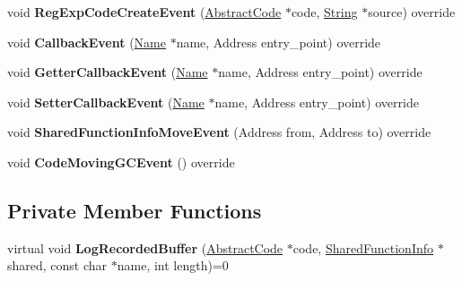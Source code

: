 \begin{DoxyCompactItemize}
\item 
void {\bfseries Reg\+Exp\+Code\+Create\+Event} (\hyperlink{classv8_1_1internal_1_1_abstract_code}{Abstract\+Code} $\ast$code, \hyperlink{classv8_1_1internal_1_1_string}{String} $\ast$source) override\hypertarget{classv8_1_1internal_1_1_code_event_logger_a8bb646de3165bbe1a39a0c07b3075f55}{}\label{classv8_1_1internal_1_1_code_event_logger_a8bb646de3165bbe1a39a0c07b3075f55}

\item 
void {\bfseries Callback\+Event} (\hyperlink{classv8_1_1internal_1_1_name}{Name} $\ast$name, Address entry\+\_\+point) override\hypertarget{classv8_1_1internal_1_1_code_event_logger_a81b0e268b2e5318d574cbf0862b101bc}{}\label{classv8_1_1internal_1_1_code_event_logger_a81b0e268b2e5318d574cbf0862b101bc}

\item 
void {\bfseries Getter\+Callback\+Event} (\hyperlink{classv8_1_1internal_1_1_name}{Name} $\ast$name, Address entry\+\_\+point) override\hypertarget{classv8_1_1internal_1_1_code_event_logger_a3caaade2e5e702420a1ac63f1a009170}{}\label{classv8_1_1internal_1_1_code_event_logger_a3caaade2e5e702420a1ac63f1a009170}

\item 
void {\bfseries Setter\+Callback\+Event} (\hyperlink{classv8_1_1internal_1_1_name}{Name} $\ast$name, Address entry\+\_\+point) override\hypertarget{classv8_1_1internal_1_1_code_event_logger_aaa5517c3a288585208e959bf92c0f5ad}{}\label{classv8_1_1internal_1_1_code_event_logger_aaa5517c3a288585208e959bf92c0f5ad}

\item 
void {\bfseries Shared\+Function\+Info\+Move\+Event} (Address from, Address to) override\hypertarget{classv8_1_1internal_1_1_code_event_logger_aba57706aa2d5625494d9cf6182a0bf07}{}\label{classv8_1_1internal_1_1_code_event_logger_aba57706aa2d5625494d9cf6182a0bf07}

\item 
void {\bfseries Code\+Moving\+G\+C\+Event} () override\hypertarget{classv8_1_1internal_1_1_code_event_logger_a1e7773a2cbfc92976ed978cd58aacce3}{}\label{classv8_1_1internal_1_1_code_event_logger_a1e7773a2cbfc92976ed978cd58aacce3}

\end{DoxyCompactItemize}
\subsection*{Private Member Functions}
\begin{DoxyCompactItemize}
\item 
virtual void {\bfseries Log\+Recorded\+Buffer} (\hyperlink{classv8_1_1internal_1_1_abstract_code}{Abstract\+Code} $\ast$code, \hyperlink{classv8_1_1internal_1_1_shared_function_info}{Shared\+Function\+Info} $\ast$shared, const char $\ast$name, int length)=0\hypertarget{classv8_1_1internal_1_1_code_event_logger_aefa97d3db407a07a22ae0be69b8c7aa4}{}\label{classv8_1_1internal_1_1_code_event_logger_aefa97d3db407a07a22ae0be69b8c7aa4}

\end{DoxyCompactItemize}
